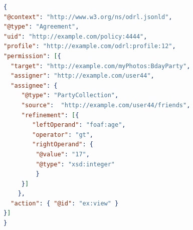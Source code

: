\documentclass[12pt,a4paper,twoside]{book}
\begin{document}
\begin{lstlisting}[language=json,firstnumber=1,caption={Constraint su party: l'azione \textbf{view} è permessa solo alle entità con età strettamente superiore a 17 anni},captionpos=b,label=esempioConParty]
{
"@context": "http://www.w3.org/ns/odrl.jsonld",
"@type": "Agreement",
"uid": "http://example.com/policy:4444",
"profile": "http://example.com/odrl:profile:12",
"permission": [{
  "target": "http://example.com/myPhotos:BdayParty",
  "assigner": "http://example.com/user44",
  "assignee": {
     "@type": "PartyCollection",
 	 "source":  "http://example.com/user44/friends",
 	 "refinement": [{
 	 	"leftOperand": "foaf:age",
 	 	"operator": "gt",
 	 	"rightOperand": { 
 	 	 "@value": "17",
 	 	 "@type": "xsd:integer"
 		 }
 	 }]
 	},
  "action": { "@id": "ex:view" }
}]
}
\end{lstlisting}
\end{document}
